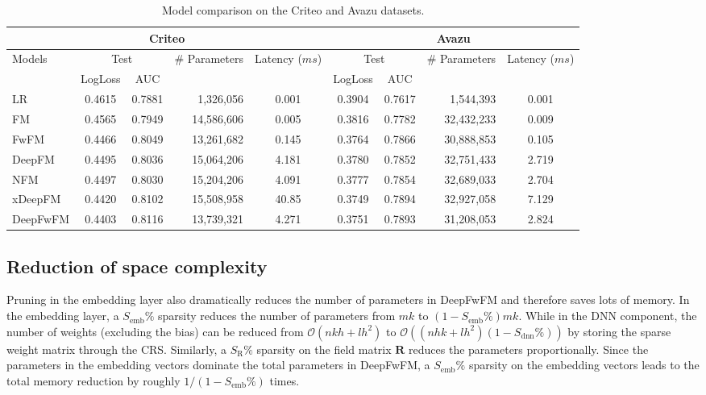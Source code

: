 \documentclass[sigconf]{acmart}
\begin{document}
\begin{table*}
 \caption{Model comparison on the Criteo and Avazu datasets.}
  \centering
\begin{tabular}{lccrc|ccrc}
    \toprule
    \multicolumn{5}{c|}{Criteo} & \multicolumn{4}{c}{Avazu} \\  
    \midrule
    \multirow{2}{*}{Models}    & \multicolumn{2}{c}{Test} & \multirow{2}{*}{\# Parameters} & \multirow{2}{*}{Latency ($ms$)}  & \multicolumn{2}{c}{Test} & \multirow{2}{*}{\# Parameters} & \multirow{2}{*}{Latency ($ms$)}  \\
      & LogLoss   & AUC &  &  & LogLoss & AUC & & \\
    \midrule
    LR      &   0.4615 & 0.7881 & 1,326,056 & 0.001 & 0.3904 & 0.7617 & 1,544,393 & 0.001 \\
    FM        & 0.4565 & 0.7949  & 14,586,606 & 0.005 &  0.3816 & 0.7782 & 32,432,233 & 0.009 \\
     FwFM        & 0.4466 & 0.8049  & 13,261,682 & 0.145 &  0.3764 & 0.7866  & 30,888,853 & 0.105 \\
    \midrule
    DeepFM    & 0.4495 & 0.8036 & 15,064,206 & 4.181 & 0.3780 & 0.7852 & 32,751,433 & 2.719    \\
    NFM        &  0.4497 & 0.8030  & 15,204,206 & 4.091 & 0.3777 & 0.7854 & 32,689,033 &  2.704 \\
    xDeepFM      & 0.4420 & 0.8102 & 15,508,958 & 40.85 &  0.3749 & 0.7894 & 32,927,058 & 7.129 \\
    \midrule
    DeepFwFM    & 0.4403 & 0.8116 & 13,739,321 & 4.271 & 0.3751 & 0.7893  & 31,208,053 & 2.824 \\
    \bottomrule
  \end{tabular}
  \vspace{1em}
  \label{criteo_data}
\end{table*}

\subsection{Reduction of space complexity} 

Pruning in the embedding layer also dramatically reduces the number of parameters in DeepFwFM and therefore saves lots of memory. In the embedding layer, a $S_{\text{emb}}\%$ sparsity reduces the number of parameters from $mk$ to $(1-S_{\text{emb}}\%)mk$. While in the DNN component, the number of weights (excluding the bias) can be reduced from $\mathcal{O}(nkh + lh^2)$ to $\mathcal{O}\left((nhk+lh^2)(1-S_{\text{dnn}}\%)\right)$ by storing the sparse weight matrix through the CRS. Similarly, a $S_{\text{R}}\%$ sparsity on the field matrix $\bm{R}$ reduces the parameters proportionally. Since the parameters in the embedding vectors dominate the total parameters in DeepFwFM, a $S_{\text{emb}}\%$ sparsity on the embedding vectors leads to the total memory reduction by roughly $1/(1-S_{\text{emb}}\%)$ times.
\end{document}
